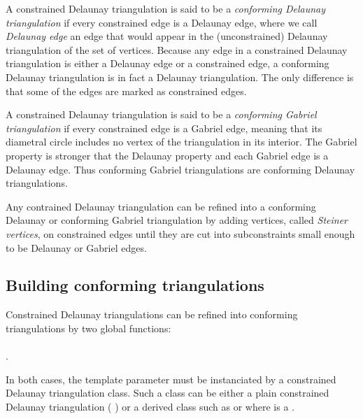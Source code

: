 A constrained Delaunay triangulation is said to be a \emph{conforming
  Delaunay triangulation} if every constrained edge is a Delaunay
edge, where we call  {\em Delaunay edge}  an edge that would  appear 
in the (unconstrained) Delaunay triangulation of the set of
vertices. Because any edge in a constrained Delaunay triangulation
is either a Delaunay edge or a constrained edge, a 
conforming   Delaunay triangulation is in fact 
a Delaunay triangulation. The only difference
is that  some of the edges  are marked as constrained edges.

A constrained Delaunay triangulation is said to be a \emph{conforming
  Gabriel triangulation} if every constrained edge is a Gabriel edge,
meaning that its diametral circle includes no vertex of the
triangulation in its interior. The Gabriel property is stronger that
the Delaunay property and each Gabriel edge is a Delaunay edge. Thus
conforming Gabriel triangulations are conforming Delaunay
triangulations.

Any contrained Delaunay triangulation can be refined into a conforming
Delaunay or conforming Gabriel triangulation by adding vertices,
called \emph{Steiner vertices}, on constrained edges until they are
cut into subconstraints small enough to be Delaunay or Gabriel edges.

\subsection{Building conforming triangulations}
\label{sec:Mesh_2_building_conforming}

Constrained Delaunay triangulations can be refined into
conforming triangulations 
by two global functions: \\
 \\
. 

 In both cases, the
template parameter  must be instanciated by a
constrained Delaunay triangulation class.
Such a class 
can be either  a plain constrained Delaunay triangulation
( ) or
a derived class such as 
  or 
where  is a
.

